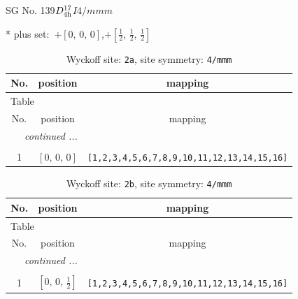 \documentclass[fleqn,8pt]{jsarticle}
\begin{document}
\setcounter{MaxMatrixCols}{32}

\renewcommand{\tablename}{Table~}
\renewcommand{\figurename}{Figure~}
\begin{center}
\LARGE
SG No. 139\quad$D_{\rm 4h}^{17}$\quad$I4/mmm$\quad[ tetragonal ]
\end{center}
* plus set:\,\,\,$+\left[ 0,\, 0,\, 0 \right]$,\quad $+\left[ \frac{1}{2},\, \frac{1}{2},\, \frac{1}{2} \right]$
\renewcommand{\arraystretch}{1.2}
\begin{longtable}{ccc}
\caption{Wyckoff site: {\tt 2a}, site symmetry: {\tt 4/mmm}}
 \\
 \hline \hline
No. & position & mapping \\ \hline \endfirsthead

\multicolumn{2}{l}{\tablename\ \thetable{}} \\
 \hline \hline
No. & position & mapping \\ \hline \endhead

 \hline \hline
\multicolumn{2}{r}{\footnotesize\it continued ...} \\ \endfoot

 \hline \hline
\multicolumn{2}{r}{} \\ \endlastfoot

1 & $\left[ 0,\, 0,\, 0 \right]$ & {\tt [1,2,3,4,5,6,7,8,9,10,11,12,13,14,15,16]} \\
\end{longtable}
\renewcommand{\arraystretch}{1.2}
\begin{longtable}{ccc}
\caption{Wyckoff site: {\tt 2b}, site symmetry: {\tt 4/mmm}}
 \\
 \hline \hline
No. & position & mapping \\ \hline \endfirsthead

\multicolumn{2}{l}{\tablename\ \thetable{}} \\
 \hline \hline
No. & position & mapping \\ \hline \endhead

 \hline \hline
\multicolumn{2}{r}{\footnotesize\it continued ...} \\ \endfoot

 \hline \hline
\multicolumn{2}{r}{} \\ \endlastfoot

1 & $\left[ 0,\, 0,\, \frac{1}{2} \right]$ & {\tt [1,2,3,4,5,6,7,8,9,10,11,12,13,14,15,16]} \\
\end{longtable}
\renewcommand{\arraystretch}{1.2}
\end{document}
